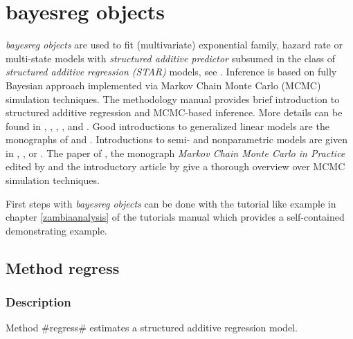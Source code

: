 \chapter{bayesreg objects}
\label{bayesreg} 

{\em bayesreg objects} are used to fit (multivariate) exponential family, hazard rate or multi-state models with {\em
structured additive predictor} subsumed in the class of {\em structured additive regression (STAR)} models, see .
Inference is based on fully Bayesian approach implemented via Markov Chain Monte Carlo (MCMC)
simulation techniques. The methodology manual provides brief introduction to structured additive regression and MCMC-based
inference. More details can be found in , , ,
,  and . Good introductions to
generalized linear models are the monographs of  and . Introductions to semi- and
nonparametric models are given in , ,  or .
The paper of , the monograph {\em Markov Chain Monte Carlo in Practice} edited by
 and the introductory article by  give a thorough overview over MCMC simulation
techniques.

First steps with {\em bayesreg objects} can be done with the
tutorial like example in chapter \ref*{zambiaanalysis} of the
tutorials manual which provides a self-contained demonstrating
example.

\clearpage

\section{Method regress}
\label{bayesregress} 

\subsection{Description}
\label{bayesregregressdescr}

Method #regress# estimates a structured additive regression model.

     

